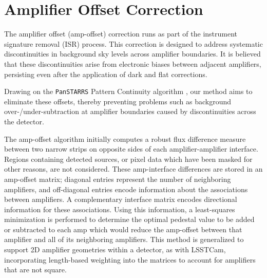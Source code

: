 \section{Amplifier Offset Correction}
\label{sec:ampoffset}
The amplifier offset (amp-offset) correction runs as part of the instrument signature removal (ISR) process.
This correction is designed to address systematic discontinuities in background sky levels across amplifier boundaries.
It is believed that these discontinuities arise from electronic biases between adjacent amplifiers, persisting even after the application of dark and flat corrections.

Drawing on the \texttt{PanSTARRS} Pattern Continuity algorithm \citep{2020ApJS..251....4W}, our method aims to eliminate these offsets, thereby preventing problems such as background over-/under-subtraction at amplifier boundaries caused by discontinuities across the detector.

The amp-offset algorithm initially computes a robust flux difference measure between two narrow strips on opposite sides of each amplifier-amplifier interface.
Regions containing detected sources, or pixel data which have been masked for other reasons, are not considered.
These amp-interface differences are stored in an amp-offset matrix; diagonal entries represent the number of neighboring amplifiers, and off-diagonal entries encode information about the associations between amplifiers.
A complementary interface matrix encodes directional information for these associations.
Using this information, a least-squares minimization is performed to determine the optimal pedestal value to be added or subtracted to each amp which would reduce the amp-offset between that amplifier and all of its neighboring amplifiers.
This method is generalized to support 2D amplifier geometries within a detector, as with LSSTCam, incorporating length-based weighting into the matrices to account for amplifiers that are not square.
